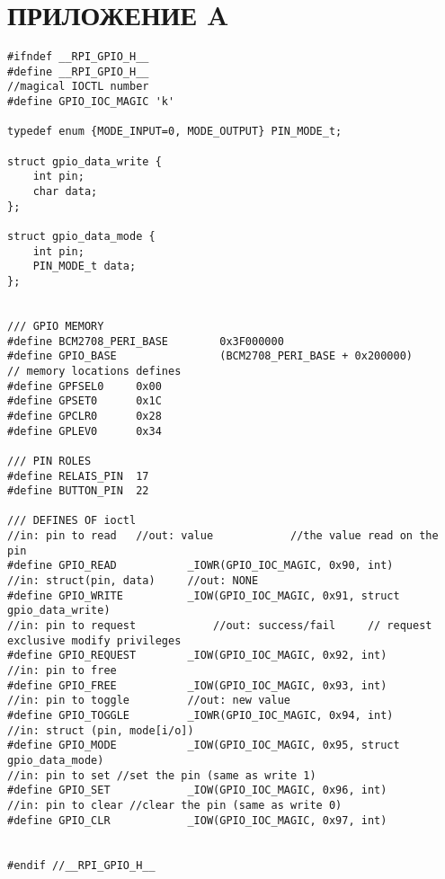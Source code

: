 \section*{ПРИЛОЖЕНИЕ A}

\begin{lstlisting}[caption = {modgpio.h}, label=lst:modgpio.h]
#ifndef __RPI_GPIO_H__
#define __RPI_GPIO_H__
//magical IOCTL number
#define GPIO_IOC_MAGIC 'k'

typedef enum {MODE_INPUT=0, MODE_OUTPUT} PIN_MODE_t;

struct gpio_data_write {
	int pin;
	char data;
};

struct gpio_data_mode {
	int pin;
	PIN_MODE_t data;
};


/// GPIO MEMORY
#define BCM2708_PERI_BASE      	 0x3F000000
#define GPIO_BASE                (BCM2708_PERI_BASE + 0x200000) 
// memory locations defines
#define GPFSEL0		0x00
#define GPSET0 		0x1C
#define GPCLR0 		0x28
#define GPLEV0 		0x34

/// PIN ROLES
#define RELAIS_PIN	17
#define BUTTON_PIN	22

/// DEFINES OF ioctl
//in: pin to read	//out: value 			//the value read on the pin
#define GPIO_READ			_IOWR(GPIO_IOC_MAGIC, 0x90, int)
//in: struct(pin, data)		//out: NONE
#define GPIO_WRITE			_IOW(GPIO_IOC_MAGIC, 0x91, struct gpio_data_write)
//in: pin to request			//out: success/fail 	// request exclusive modify privileges
#define GPIO_REQUEST		_IOW(GPIO_IOC_MAGIC, 0x92, int)
//in: pin to free
#define GPIO_FREE			_IOW(GPIO_IOC_MAGIC, 0x93, int)
//in: pin to toggle			//out: new value
#define GPIO_TOGGLE			_IOWR(GPIO_IOC_MAGIC, 0x94, int)
//in: struct (pin, mode[i/o])
#define GPIO_MODE			_IOW(GPIO_IOC_MAGIC, 0x95, struct gpio_data_mode)
//in: pin to set //set the pin (same as write 1)
#define GPIO_SET			_IOW(GPIO_IOC_MAGIC, 0x96, int)
//in: pin to clear //clear the pin (same as write 0)
#define GPIO_CLR			_IOW(GPIO_IOC_MAGIC, 0x97, int)


#endif //__RPI_GPIO_H__
\end{lstlisting}

